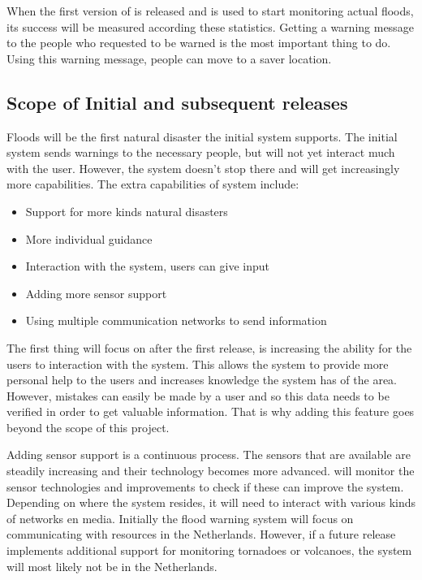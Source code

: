 When the first version of \ProjectName{} is released and is used to start monitoring actual floods, its success will be measured according these statistics. Getting a warning message to the people who requested to be warned is the most important thing to do. Using this warning message, people can move to a saver location.

\subsection{Scope of Initial and subsequent releases}

Floods will be the first natural disaster the initial system supports. The initial system sends warnings to the necessary people, but will not yet interact much with the user. However, the system doesn't stop there and will get increasingly more capabilities. The extra capabilities of system include:
	\begin{itemize}
		\item Support for more kinds natural disasters
		\item More individual guidance
		\item Interaction with the system, users can give input
		\item Adding more sensor support
		\item Using multiple communication networks to send information
	\end{itemize}

The first thing \CompanyName{} will focus on after the first release, is increasing the ability for the users to interaction with the system. This allows the system to provide more personal help to the users and increases knowledge the system has of the area. However, mistakes can easily be made by a user and so this data needs to be verified in order to get valuable information. That is why adding this feature goes beyond the scope of this project.

Adding sensor support is a continuous process. The sensors that are available are steadily increasing and their technology becomes more advanced. \CompanyName{} will monitor the sensor technologies and improvements to check if these can improve the system.
Depending on where the system resides, it will need to interact with various kinds of networks en media. Initially the flood warning system will focus on communicating with resources in the Netherlands. However, if a future release implements additional support for monitoring tornadoes or volcanoes, the system will most likely not be in the Netherlands.

